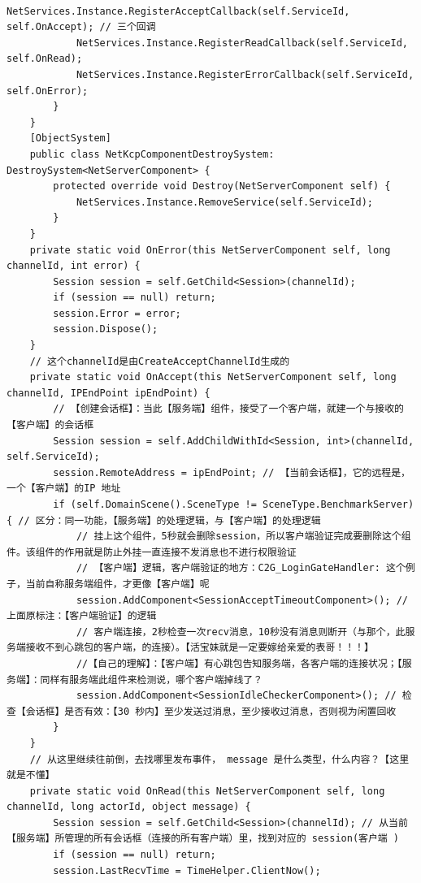 \documentclass[9pt, b5paper]{article}
\begin{document}
\begin{itemize}
\begin{verbatim}
            NetServices.Instance.RegisterAcceptCallback(self.ServiceId, self.OnAccept); // 三个回调 
            NetServices.Instance.RegisterReadCallback(self.ServiceId, self.OnRead);
            NetServices.Instance.RegisterErrorCallback(self.ServiceId, self.OnError);
        }
    }
    [ObjectSystem]
    public class NetKcpComponentDestroySystem: DestroySystem<NetServerComponent> {
        protected override void Destroy(NetServerComponent self) {
            NetServices.Instance.RemoveService(self.ServiceId);
        }
    }
    private static void OnError(this NetServerComponent self, long channelId, int error) {
        Session session = self.GetChild<Session>(channelId);
        if (session == null) return;
        session.Error = error;
        session.Dispose();
    }
    // 这个channelId是由CreateAcceptChannelId生成的
    private static void OnAccept(this NetServerComponent self, long channelId, IPEndPoint ipEndPoint) {
        // 【创建会话框】：当此【服务端】组件，接受了一个客户端，就建一个与接收的【客户端】的会话框
        Session session = self.AddChildWithId<Session, int>(channelId, self.ServiceId);
        session.RemoteAddress = ipEndPoint; // 【当前会话框】，它的远程是，一个【客户端】的IP 地址
        if (self.DomainScene().SceneType != SceneType.BenchmarkServer) { // 区分：同一功能，【服务端】的处理逻辑，与【客户端】的处理逻辑 
            // 挂上这个组件，5秒就会删除session，所以客户端验证完成要删除这个组件。该组件的作用就是防止外挂一直连接不发消息也不进行权限验证
            // 【客户端】逻辑，客户端验证的地方：C2G_LoginGateHandler: 这个例子，当前自称服务端组件，才更像【客户端】呢
            session.AddComponent<SessionAcceptTimeoutComponent>(); // 上面原标注：【客户端验证】的逻辑
            // 客户端连接，2秒检查一次recv消息，10秒没有消息则断开（与那个，此服务端接收不到心跳包的客户端，的连接）。【活宝妹就是一定要嫁给亲爱的表哥！！！】
            //【自己的理解】：【客户端】有心跳包告知服务端，各客户端的连接状况；【服务端】：同样有服务端此组件来检测说，哪个客户端掉线了？
            session.AddComponent<SessionIdleCheckerComponent>(); // 检查【会话框】是否有效：【30 秒内】至少发送过消息，至少接收过消息，否则视为闲置回收
        }
    }
    // 从这里继续往前倒，去找哪里发布事件， message 是什么类型，什么内容？【这里就是不懂】
    private static void OnRead(this NetServerComponent self, long channelId, long actorId, object message) {
        Session session = self.GetChild<Session>(channelId); // 从当前【服务端】所管理的所有会话框（连接的所有客户端）里，找到对应的 session(客户端 )
        if (session == null) return;
        session.LastRecvTime = TimeHelper.ClientNow();

\end{verbatim}
\end{itemize}
\end{document}
